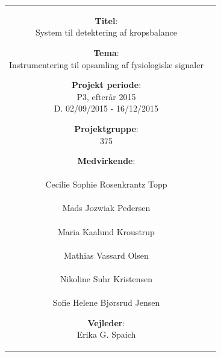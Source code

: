 \begin{nopagebreak}
{\begin{tabular}{cc}
\parbox{7cm}{
\begin{description}

\item \textbf{Titel}: \\
System til detektering af kropsbalance \\
\item \textbf{Tema}: \\ 
Instrumentering til opsamling af fysiologiske signaler\\
\item \textbf{Projekt periode}:\\
   P3, efterår 2015\\
   D. 02/09/2015 - 16/12/2015
  \hspace{4cm}
\item \textbf{Projektgruppe}:\\
  375
  \hspace{4cm}
\item \textbf{Medvirkende}:\\
\underline{\hspace{4cm}}\\
Cecilie Sophie Rosenkrantz Topp  \\
\underline{\hspace{4cm}}\\
Mads Jozwiak Pedersen \\
\underline{\hspace{4cm}}\\
Maria Kaalund Kroustrup \\
\underline{\hspace{4cm}}\\
Mathias Vassard Olsen \\
\underline{\hspace{4cm}}\\
Nikoline Suhr Kristensen \\
\underline{\hspace{4cm}}\\
Sofie Helene Bjørsrud Jensen \\
\hspace{2cm}
\item \textbf{Vejleder}:\\
Erika G. Spaich  \\

  
\end{description}

}
\end{tabular}}
\end{nopagebreak}
